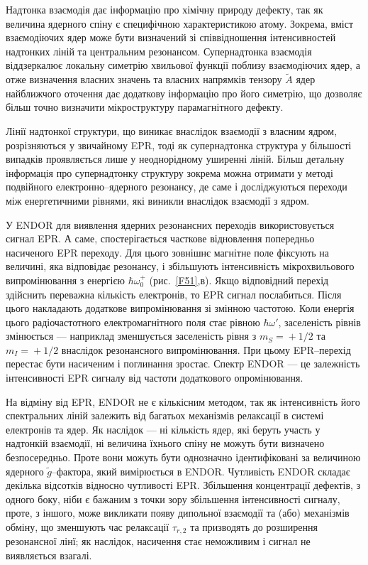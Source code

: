 \documentclass[10pt,a5paper,titlepage,oneside]{book}
\numberwithin{equation}{part}
\begin{document}
Надтонка взаємодія дає інформацію про хімічну природу дефекту,
так як величина ядерного спіну є специфічною характеристикою атому.
Зокрема, вміст взаємодіючих ядер може бути визначений
зі співвідношення інтенсивностей надтонких ліній та центральним резонансом.
Супернадтонка взаємодія віддзеркалює локальну симетрію хвильової функції поблизу
взаємодіючих ядер, а отже визначення власних значень та власних
напрямків тензору $\tilde{A}$ ядер найближчого оточення дає додаткову інформацію
про його симетрію, що дозволяє більш точно визначити мікроструктуру
парамагнітного дефекту.

Лінії надтонкої структури, що виникає внаслідок взаємодії з власним ядром,
розрізняються у звичайному EPR, тоді як супернадтонка структура у більшості
випадків проявляється лише у неоднорідному уширенні ліній.
Більш детальну інформація про супернадтонку структуру зокрема можна отримати
у методі подвійного електронно--ядерного резонансу, де саме і
досліджуються переходи між енергетичними рівнями, які виникли внаслідок взаємодії з ядром.

У ENDOR для виявлення ядерних резонансних переходів використовується сигнал EPR.
А саме, спостерігається часткове відновлення попередньо насиченого EPR переходу.
Для цього зовнішнє магнітне поле фіксують на величині, яка
відповідає резонансу, і збільшують інтенсивність мікрохвильового випромінювання з енергією $\hbar\omega_0^+$ (рис.~\ref{F51},в).
Якщо відповідний перехід здійснить переважна кількість електронів,
то EPR сигнал послабиться.
Після цього накладають додаткове випромінювання
зі змінною частотою.
Коли енергія цього радіочастотного електромагнітного поля стає рівною $\hbar \omega'$,
заселеність рівнів змінюється --- наприклад
зменшується заселеність рівня з $m_S\!=\!+1/2$ та $m_I\!=\!+1/2$ внаслідок
резонансного випромінювання.
При цьому EPR--перехід перестає бути насиченим і поглинання зростає.
Спектр ENDOR --- це залежність інтенсивності EPR сигналу від частоти додаткового
опромінювання.

На відміну від EPR, ENDOR не є кількісним методом,
так як інтенсивність його спектральних ліній залежить від багатьох
механізмів релаксації в системі електронів та ядер.
Як наслідок --- ні кількість ядер, які беруть участь у надтонкій взаємодії,
ні величина їхнього спіну не можуть бути визначено безпосередньо.
Проте вони можуть бути однозначно ідентифіковані за величиною ядерного $\tilde{g}$--фактора,
який вимірюється в ENDOR.
Чутливість ENDOR складає декілька відсотків відносно чутливості EPR.
Збільшення концентрації дефектів, з одного боку, ніби є бажаним з точки зору збільшення інтенсивності сигналу,
проте, з іншого, може викликати  появу дипольної взаємодії та (або) механізмів обміну,
що зменшують час релаксації $\tau_{r,2}$ та призводять до розширення резонансної лінї;
як наслідок, насичення стає неможливим і сигнал не виявляється взагалі.



\end{document}
